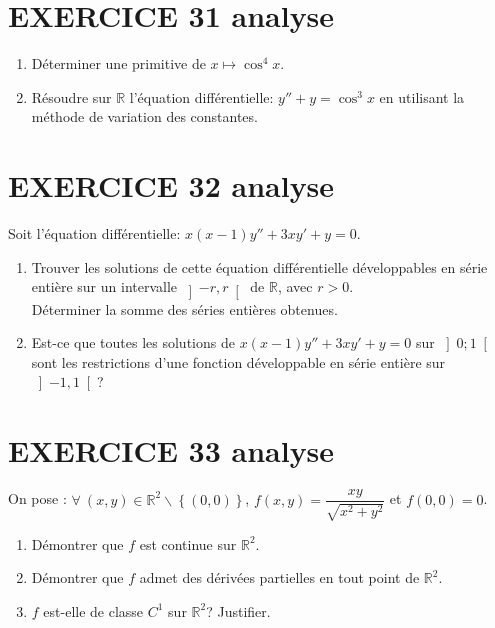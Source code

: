 \documentclass[10pt,oneside]{article}
\begin{document}
\begin{flushleft}
\section*{EXERCICE 31 \:analyse }

\begin{enumerate}

\item
Déterminer une primitive de $x\longmapsto \cos^4x$.
\item
R\'{e}soudre sur $\mathbb{R}$ l'\'{e}quation diff\'{e}rentielle: $y''+y=\cos^3 x$ en utilisant la m\'{e}thode de variation des constantes.
\end{enumerate}
\medskip


\section*{EXERCICE 32 \:analyse }


Soit l'équation différentielle: $x(x-1)y''+3xy'+y=0$.
\begin{enumerate}
\item Trouver les solutions de cette équation différentielle développables en série entière sur un intervalle $\left]-r,r \right[$ de $\mathbb{R}$, avec $r>0$.\\ Déterminer la somme des séries entières obtenues.

\item 
Est-ce que toutes les solutions de $x(x-1)y''+3xy'+y=0$ sur $\left]0;1 \right[$ sont les restrictions d'une fonction développable en série entière sur $\left]-1,1 \right[$?\\
\end{enumerate}


\section*{EXERCICE 33 \:analyse }
On pose : $\forall\:(x,y)\in\mathbb{R}^2\backslash \left\lbrace (0,0)\right\rbrace$,   $f\left( x,y\right) =\dfrac{xy}{\sqrt{x^{2}+y^{2}}}$ et $f\left( 0,0\right) =0$.

\begin{enumerate}
\item Démontrer que $f$ est continue sur $\mathbb{R}^{2}$.

\item Démontrer que $f$ admet des d\'{e}riv\'{e}es partielles en tout point de $\mathbb{R}^{2}$.
\item $f$ est-elle de classe $C^{1}$ sur $\mathbb{R}^{2}$? Justifier.


\end{enumerate}
\end{flushleft}
\end{document}
